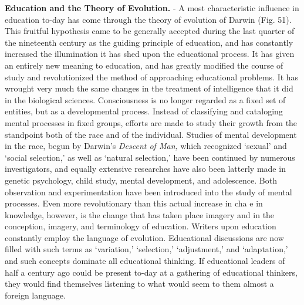 \documentclass[
]{book}
\begin{document}
\textbf{Education and the Theory of Evolution.} - A most characteristic influence in education to-day has come through the theory of evolution of Darwin (Fig. 51). This fruitful hypothesis came to be generally accepted during the last quarter of the nineteenth century as the guiding principle of education, and has constantly increased the illumination it has shed upon the educational process. It has given an entirely new meaning to education, and has greatly modified the course of study and revolutionized the method of approaching educational problems. It has wrought very much the same changes in the treatment of intelligence that it did in the biological sciences. Consciousness is no longer regarded as a fixed set of entities, but as a developmental process. Instead of classifying and cataloging mental processes in fixed groups, efforts are made to study their growth from the standpoint both of the race and of the individual. Studies of mental development in the race, begun by Darwin's \emph{Descent of Man,} which recognized `sexual' and `social selection,' as well as `natural selection,' have been continued by numerous investigators, and equally extensive researches have also been latterly made in genetic psychology, child study, mental development, and adolescence. Both observation and experimentation have been introduced into the study of mental processes. Even more revolutionary than this actual increase in cha e in knowledge, however, is the change that has taken place imagery and in the conception, imagery, and terminology of education. Writers upon education constantly employ the language of evolution. Educational discussions are now filled with such terms as `variation,' `selection,' `adjustment,' and `adaptation,' and such concepts dominate all educational thinking. If educational leaders of half a century ago could be present to-day at a gathering of educational thinkers, they would find themselves listening to what would seem to them almost a foreign language.
\end{document}

